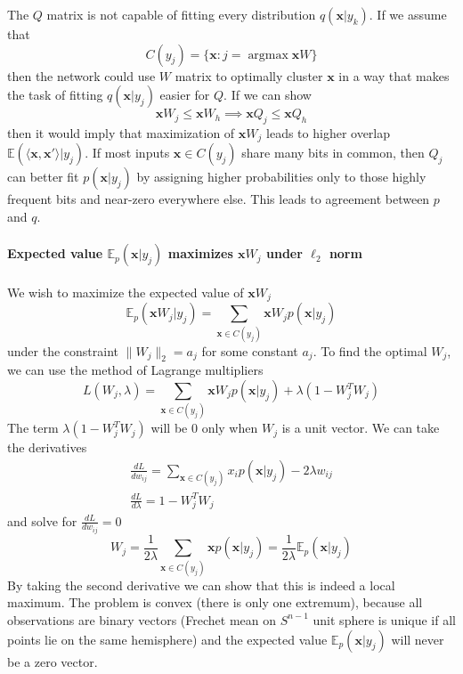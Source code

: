 \documentclass[12pt]{article}
\DeclareMathOperator*{\argmax}{argmax}
\begin{document}
The $Q$ matrix is not capable of fitting every distribution $q(\boldsymbol{x}|y_k)$.
If we assume that
\[
C(y_j) = \{\boldsymbol{x}:j=\argmax \boldsymbol{x}W\}
\]
then the network could use $W$ matrix to optimally cluster $\boldsymbol{x}$ in a way that makes the task of fitting $q(\boldsymbol{x}|y_j)$ easier for $Q$. If we can show
\[
\boldsymbol{x}W_j \le \boldsymbol{x}W_h  \implies  \boldsymbol{x}Q_j \le \boldsymbol{x}Q_h 
\]
then it would imply that maximization of $\boldsymbol{x}W_j$ leads to higher overlap
$\mathbb{E}(\langle \boldsymbol{x}, \boldsymbol{x}'\rangle|y_j) $. If most inputs $\boldsymbol{x}\in C(y_j)$ share many bits in common, then $Q_j$ can better fit $p(\boldsymbol{x}|y_j)$ by assigning higher probabilities only to those highly frequent bits and near-zero everywhere else. This leads to agreement between $p$ and $q$. 



\paragraph{Expected value $\mathbb{E}_{p}(\boldsymbol{x}|y_j)$ maximizes $\boldsymbol{x}W_j$ under $\ell_2$ norm} 

We wish to maximize the expected value of $\boldsymbol{x}W_j$
\[
\mathbb{E}_{p}(\boldsymbol{x}W_j|y_j)=\sum_{\boldsymbol{x}\in C(y_j)} \boldsymbol{x} W_j p(\boldsymbol{x}|y_j)
\]
 under the constraint $\lVert W_j \rVert_2 = a_j$ for some constant $a_j$.  To find the optimal $W_j$, we can use the method of Lagrange multipliers
\[
L(W_j,\lambda) = \sum_{\boldsymbol{x}\in C(y_j)} \boldsymbol{x} W_j p(\boldsymbol{x}|y_j) + \lambda(1- W_j^{T}W_j )
\]
The term $\lambda(1- W_j^{T}W_j)$ will be $0$ only when $W_j$ is a unit vector.
We can take the derivatives 
\begin{gather*}
	\frac{d L}{d w_{ij}} = \sum_{\boldsymbol{x}\in C(y_j)} x_i p(\boldsymbol{x}|y_j) - 2\lambda w_{ij} \\
	\frac{d L}{d \lambda} = 1 - W_j^{T}W_j
\end{gather*}
and solve for $\frac{d L}{d w_{ij}}=0$
\[
W_j = \frac{1}{2\lambda }\sum_{\boldsymbol{x}\in C(y_j)} \boldsymbol{x} p(\boldsymbol{x}|y_j)  = \frac{1}{2\lambda } \mathbb{E}_{p}(\boldsymbol{x}|y_j)
\]
By taking the second derivative we can show that this is indeed a local maximum.
The problem is convex (there is only one extremum), because all observations are binary vectors (Frechet mean on $S^{n-1}$ unit sphere is unique if all points lie on the same hemisphere) and the expected value $\mathbb{E}_{p}(\boldsymbol{x}|y_j)$ will never be a zero vector.
\end{document}
